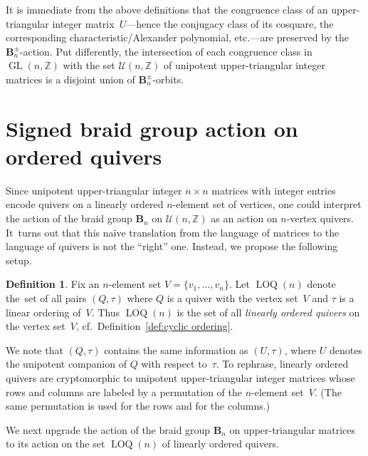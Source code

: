 \documentclass[11pt, letterpaper]{amsart}
\theoremstyle{definition}
\newtheorem{definition}[theorem]{Definition}
\numberwithin{equation}{section}
\def\ZZ{{\mathbb Z}}
\def\GL{{\operatorname{GL}}}
\newcommand\LOQ{\operatorname{LOQ}}
\begin{document}
It is immediate from the above definitions that the congruence class of an upper-tri\-angular integer matrix~$U$---hence 
the conjugacy class of its cosquare, the corresponding characteristic/Alexander polynomial, etc.---are 
preserved by the $\mathbf{B}_n^\pm$-action.
Put differently, the intersection of each congruence class in $\GL(n,\ZZ)$ 
with the set $\mathcal{U}(n,\ZZ)$ of unipotent upper-triangular integer matrices
is a disjoint union of \hbox{$\mathbf{B}_n^\pm$-orbits}. 




\pagebreak[3]

\section{Signed braid group action on ordered quivers}

Since unipotent upper-triangular integer $n\times n$ matrices with integer entries encode 
quivers on a linearly ordered $n$-element set of vertices,
one could interpret the action of the braid group $\mathbf{B}_n$ on $\mathcal{U}(n,\ZZ)$ as an action on $n$-vertex quivers. 
It~turns out that this na\"ive translation from the language of matrices to the language of quivers is not the ``right'' one.
Instead, we propose the following setup. 

\pagebreak[3]

\begin{definition}
Fix an $n$-element set $V=\{v_1,\dots,v_n\}$.
Let $\LOQ(n)$ denote the~set of all pairs $(Q,\tau)$ where 
$Q$ is a quiver with the vertex set~$V$ and $\tau$ is a linear ordering of~$V$. 
Thus $\LOQ(n)$ is the set of all \emph{linearly ordered quivers} on the vertex set~$V$, cf.\ Definition~\ref{def:cyclic ordering}. 

We note that $(Q,\tau)$ contains the same information as $(U,\tau)$, 
where $U$ denotes the unipotent companion of $Q$ with respect to~$\tau$. 
To rephrase, linearly ordered quivers are crypto\-morphic to unipotent upper-triangular integer matrices
whose rows and columns are labeled by a permutation of the $n$-element set~$V$. 
(The same permutation is used for the rows and for the columns.)
\end{definition}

We next upgrade the action of the braid group $\mathbf{B}_n$ on 
upper-triangular matrices to its action on the set $\LOQ(n)$ of linearly ordered quivers.
\end{document}
